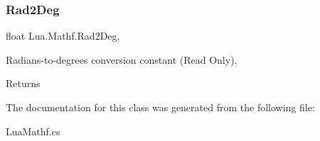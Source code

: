 \subsubsection{\texorpdfstring{Rad2Deg}{Rad2Deg}}
{\footnotesize\ttfamily float Lua.\+Mathf.\+Rad2\+Deg\hspace{0.3cm}{\ttfamily [static]}, {\ttfamily [get]}}



Radians-\/to-\/degrees conversion constant (Read Only). 

\begin{DoxyReturn}{Returns}

\end{DoxyReturn}


The documentation for this class was generated from the following file\+:\begin{DoxyCompactItemize}
\item 
Lua\+Mathf.\+cs\end{DoxyCompactItemize}
